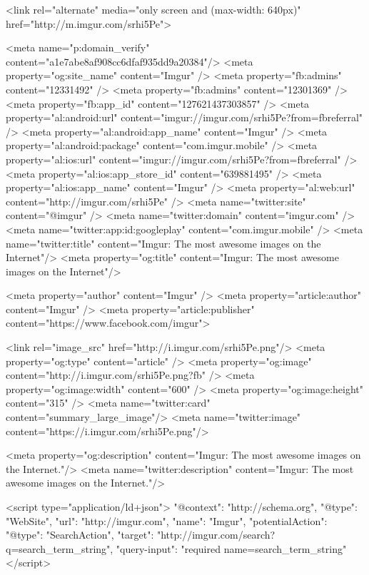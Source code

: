                 <link rel="alternate" media="only screen and (max-width: 640px)" href="http://m.imgur.com/srhi5Pe">
    

    <meta name="p:domain_verify" content="a1e7abe8af908cc6dfaf935dd9a20384"/>
    <meta property="og:site_name" content="Imgur" />
    <meta property="fb:admins" content="12331492" />
    <meta property="fb:admins" content="12301369" />
    <meta property="fb:app_id" content="127621437303857" />
    <meta property="al:android:url" content="imgur://imgur.com/srhi5Pe?from=fbreferral" />
    <meta property="al:android:app_name" content="Imgur" />
    <meta property="al:android:package" content="com.imgur.mobile" />
    <meta property="al:ios:url" content="imgur://imgur.com/srhi5Pe?from=fbreferral" />
    <meta property="al:ios:app_store_id" content="639881495" />
    <meta property="al:ios:app_name" content="Imgur" />
    <meta property="al:web:url" content="http://imgur.com/srhi5Pe" />
    <meta name="twitter:site" content="@imgur" />
    <meta name="twitter:domain" content="imgur.com" />
    <meta name="twitter:app:id:googleplay" content="com.imgur.mobile" />
                <meta name="twitter:title" content="Imgur: The most awesome images on the Internet"/>
        <meta property="og:title" content="Imgur: The most awesome images on the Internet"/>
    

    <meta property="author" content="Imgur" />
    <meta property="article:author" content="Imgur" />
    <meta property="article:publisher" content="https://www.facebook.com/imgur">

    

                        <link rel="image_src"            href="http://i.imgur.com/srhi5Pe.png"/>
            <meta property="og:type"         content="article" />
            <meta property="og:image"        content="http://i.imgur.com/srhi5Pe.png?fb" />
            <meta property="og:image:width"  content="600" />
            <meta property="og:image:height" content="315" />
            <meta name="twitter:card"        content="summary_large_image"/>
            <meta name="twitter:image"       content="https://i.imgur.com/srhi5Pe.png"/>
        
    

            <meta property="og:description" content="Imgur: The most awesome images on the Internet."/>
        <meta name="twitter:description" content="Imgur: The most awesome images on the Internet."/>
    

    
    <script type="application/ld+json">
        {
            "@context": "http://schema.org",
            "@type": "WebSite",
            "url": "http://imgur.com",
            "name": "Imgur",
            "potentialAction": {
                "@type": "SearchAction",
                "target": "http://imgur.com/search?q={search_term_string}",
                "query-input": "required name=search_term_string"
            }
        }
    </script>
    
